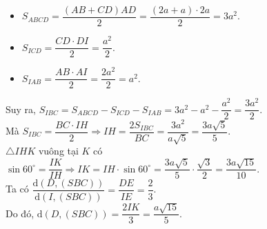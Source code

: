 \begin{bt}
{\begin{itemize}
	\item $S_{ABCD}=\dfrac{(AB+CD)AD}{2}=\dfrac{(2a+a)\cdot 2a}{2}=3a^2$.
	\item $S_{ICD}=\dfrac{CD\cdot DI}{2}=\dfrac{a^2}{2}$.
	\item $S_{IAB}=\dfrac{AB\cdot AI}{2}=\dfrac{2a^2}{2}=a^2$.
\end{itemize}
Suy ra, $S_{IBC}=S_{ABCD}-S_{ICD}-S_{IAB}=3a^2-a^2-\dfrac{a^2}{2}=\dfrac{3a^2}{2}$.\\
Mà $S_{IBC}=\dfrac{BC\cdot IH}{2}\Rightarrow IH=\dfrac{2S_{IBC}}{BC}=\dfrac{3a^2}{a\sqrt{5}}=\dfrac{3a\sqrt{5}}{5}$.\\
$\triangle IHK$ vuông tại $K$ có $\sin 60^\circ=\dfrac{IK}{IH}\Rightarrow IK=IH\cdot \sin 60^\circ=\dfrac{3a\sqrt{5}}{5}\cdot\dfrac{\sqrt{3}}{2}=\dfrac{3a\sqrt{15}}{10}$.\\
Ta có $\dfrac{\mathrm{d}(D,(SBC))}{\mathrm{d}(I,(SBC))}=\dfrac{DE}{IE}=\dfrac{2}{3}$.\\
Do đó, $\mathrm{d}(D,(SBC))=\dfrac{2IK}{3}=\dfrac{a\sqrt{15}}{5}$.
}
\end{bt}

